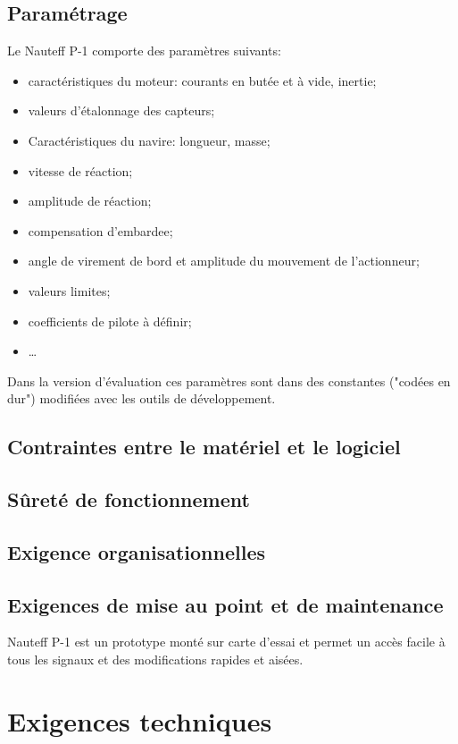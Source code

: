 \documentclass[a4paper,11pt]{report}
\begin{document}
\subsection{Paramétrage}
Le Nauteff P-1 comporte des paramètres suivants:
\begin{itemize}
	\item caractéristiques du moteur: courants en butée et à vide, inertie;
	\item valeurs d'étalonnage des capteurs;
	\item Caractéristiques du navire: longueur, masse;
	\item vitesse de réaction;
	\item amplitude de réaction;
	\item compensation d'\gls{embardee};
	\item angle de virement de bord et amplitude du mouvement de l'actionneur;
	\item valeurs limites;
	\item coefficients de pilote à définir;
	\item \ldots
\end{itemize}
Dans la version d'évaluation ces paramètres sont dans des constantes
("codées en dur") modifiées avec les outils de développement.

\subsection{Contraintes entre le matériel et le logiciel}
\subsection{Sûreté de fonctionnement}

\subsection{Exigence organisationnelles}

\subsection{Exigences de mise au point et de maintenance}
Nauteff P-1 est un prototype monté sur carte d'essai et permet un
accès facile à tous les signaux et des modifications rapides et aisées.

\section{Exigences techniques}
\end{document}
